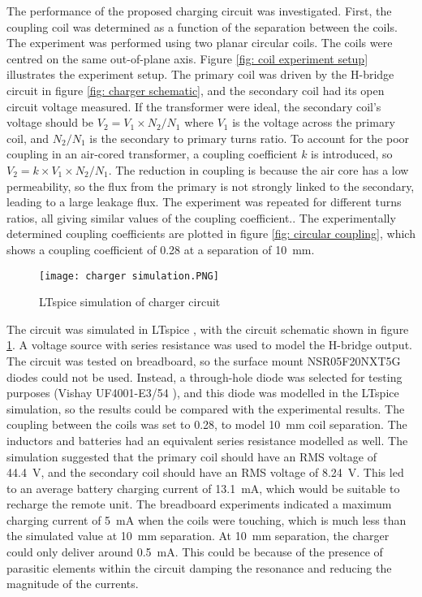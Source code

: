 The performance of the proposed charging circuit was investigated. First, the coupling coil was determined as a function of the separation between the coils. The experiment was performed using two planar circular coils. The coils were centred on the same out-of-plane axis. Figure \ref{fig: coil experiment setup} illustrates the experiment setup. The primary coil was driven by the H-bridge circuit in figure \ref{fig: charger schematic}, and the secondary coil had its open circuit voltage measured. If the transformer were ideal, the secondary coil's voltage should be $V_2 = V_1 \times N_2 / N_1$ where $V_1$ is the voltage across the primary coil, and $N_2 / N_1$ is the secondary to primary turns ratio. To account for the poor coupling in an air-cored transformer, a coupling coefficient $k$ is introduced, so $V_2 = k \times V_1 \times N_2 / N_1$. The reduction in coupling is because the air core has a low permeability, so the flux from the primary is not strongly linked to the secondary, leading to a large leakage flux. The experiment was repeated for different turns ratios, all giving similar values of the coupling coefficient.. The experimentally determined coupling coefficients are plotted in figure \ref{fig: circular coupling}, which shows a coupling coefficient of 0.28 at a separation of \SI{10}{\milli\metre}.\\


\begin{figure}[htbp]
	\centering
	\texttt{[image: charger simulation.PNG]}
	\caption{LTspice simulation of charger circuit}
	\label{fig: charger simulation}
\end{figure}

The circuit was simulated in LTspice \cite{ltspice}, with the circuit schematic shown in figure \ref{fig: charger simulation}. A voltage source with series resistance was used to model the H-bridge output. The circuit was tested on breadboard, so the surface mount NSR05F20NXT5G diodes could not be used. Instead, a through-hole diode was selected for testing purposes (Vishay UF4001-E3/54 \cite{tht_diode}), and this diode was modelled in the LTspice simulation, so the results could be compared with the experimental results. The coupling between the coils was set to 0.28, to model \SI{10}{\milli\metre} coil separation. The inductors and batteries had an equivalent series resistance modelled as well. The simulation suggested that the primary coil should have an RMS voltage of \SI{44.4}{\volt}, and the secondary coil should have an RMS voltage of \SI{8.24}{\volt}. This led to an average battery charging current of \SI{13.1}{\milli\ampere}, which would be suitable to recharge the remote unit. The breadboard experiments indicated a maximum charging current of \SI{5}{\milli\ampere} when the coils were touching, which is much less than the simulated value at \SI{10}{\milli\metre} separation. At \SI{10}{\milli\metre} separation, the charger could only deliver around \SI{0.5}{\milli\ampere}. This could be because of the presence of parasitic elements within the circuit damping the resonance and reducing the magnitude of the currents. \\ %

